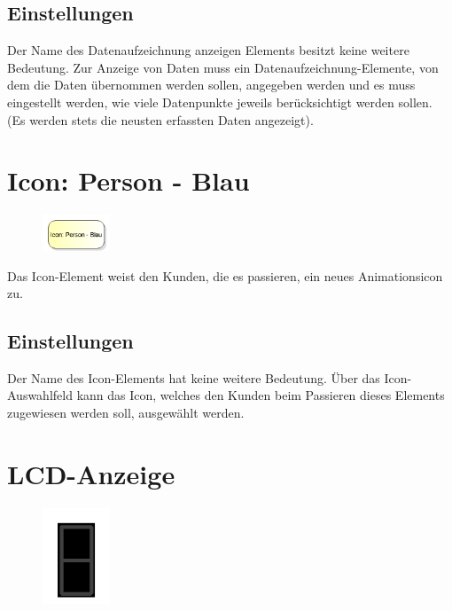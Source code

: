 \subsection*{Einstellungen}

Der Name des Datenaufzeichnung anzeigen Elements besitzt keine weitere Bedeutung.
Zur Anzeige von Daten muss ein Datenaufzeichnung-Elemente, von dem die Daten
übernommen werden sollen, angegeben werden und es muss eingestellt werden, wie
viele Datenpunkte jeweils berücksichtigt werden sollen. (Es werden stets die neusten
erfassten Daten angezeigt).


\section{Icon: Person - Blau}
\label{ref:ModelElementClientIcon}

\begin{figure}
\vspace{-22pt}
\includegraphics[width=2cm]{imageModelElementClientIcon.png}
\vspace{-22pt}
\end{figure}

Das Icon-Element weist den Kunden, die es passieren, ein neues Animationsicon zu.

\subsection*{Einstellungen}

Der Name des Icon-Elements hat keine weitere Bedeutung. Über das Icon-Auswahlfeld kann das Icon,
welches den Kunden beim Passieren dieses Elements zugewiesen werden soll, ausgewählt werden.


\section{LCD-Anzeige}
\label{ref:ModelElementAnimationLCD}

\begin{figure}
\vspace{-22pt}
\includegraphics[width=2cm]{imageModelElementAnimationLCD.png}
\vspace{-22pt}
\end{figure}

